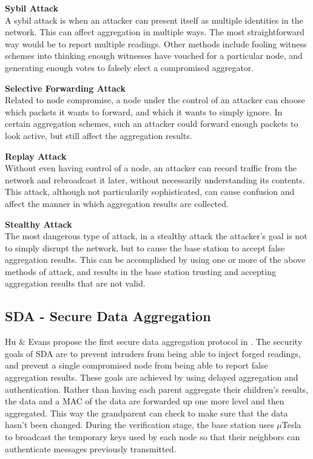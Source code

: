 \documentclass[a4paper]{article}
\begin{document}
{\bf Sybil Attack} \\
A sybil attack is when an attacker can present itself as multiple identities
in the network. This can affect aggregation in multiple ways. The most
straightforward way would be to report multiple readings. Other methods
include fooling witness schemes into thinking enough witnesses have vouched
for a particular node, and generating enough votes to falsely elect a
compromised aggregator.

{\bf Selective Forwarding Attack} \\
Related to node compromise, a node under the control of an attacker can choose
which packets it wants to forward, and which it wants to simply ignore. In
certain aggregation schemes, such an attacker could forward enough packets to
look active, but still affect the aggregation results.

{\bf Replay Attack} \\
Without even having control of a node, an attacker can record traffic from the
network and rebroadcast it later, without necessarily understanding its
contents. This attack, although not particularily sophisticated, can cause
confusion and affect the manner in which aggregation results are collected.

{\bf Stealthy Attack} \\
The most dangerous type of attack, in a stealthy attack the attacker's goal is
not to simply disrupt the network, but to cause the base station to accept
false aggregation results. This can be accomplished by using one or more of
the above methods of attack, and results in the base station trusting and
accepting aggregation results that are not valid.

\subsection{SDA - Secure Data Aggregation}

Hu \& Evans propose the first secure data aggregation protocol in
\cite{SDA}. The security goals of SDA are to prevent intruders from being able
to inject forged readings, and prevent a single compromised node from being
able to report false aggregation results. These goals are achieved by using
delayed aggregation and authentication. Rather than having each parent
aggregate their children's results, the data and a MAC of the data are
forwarded up one more level and then aggregated. This way the grandparent can
check to make sure that the data hasn't been changed. During the verification
stage, the base station uses $\mu$Tesla to broadcast the temporary keys used
by each node so that their neighbors can authenticate messages previously
transmitted.
\end{document}
